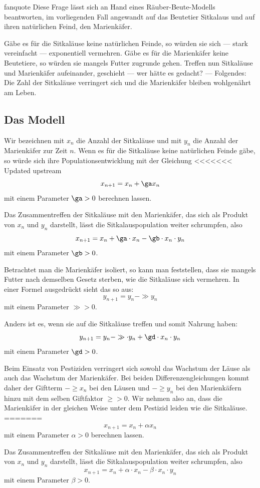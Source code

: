 \documentclass[%
<<<<<<< Updated upstream
<<<<<<< Updated upstream
11pt,%
twoside,%
titlepage,%
german,%
headsepline%
]{scrartcl}
\begin{document}
\begin{uebenv}{fanquote}
Diese Frage lässt sich an Hand eines Räuber-Beute-Modells beantworten, im vorliegenden Fall angewandt auf das Beutetier Sitkalaus und auf ihren natürlichen Feind, den Marienkäfer.

Gäbe es für die Sitkaläuse keine natürlichen Feinde, so würden sie sich --- stark vereinfacht --- exponentiell vermehren. Gäbe es für die Marienkäfer keine Beutetiere, so würden sie mangels Futter zugrunde gehen. Treffen nun Sitkaläuse und Marienkäfer aufeinander, geschieht --- wer hätte es gedacht? --- Folgendes: Die Zahl der Sitkaläuse verringert sich und die Marienkäfer bleiben wohlgenährt am Leben.

\subsection{Das Modell}
Wir bezeichnen mit $x_n$ die Anzahl der Sitkaläuse und mit $y_n$ die Anzahl der Marienkäfer zur Zeit $n$.
Wenn es für die Sitkaläuse keine natürlichen Feinde gäbe, so würde sich ihre Populationsentwicklung mit der Gleichung
<<<<<<< Updated upstream
$$x_{n+1}=x_n+\ga x_n$$
mit einem Parameter $\ga > 0$ berechnen lassen.

Das Zusammentreffen der Sitkaläuse mit den Marienkäfer, das sich als Produkt von $x_n$ und $y_n$ darstellt, lässt die Sitkalauspopulation weiter schrumpfen, also
$$x_{n+1}=x_n+\ga\cdot x_n-\gb\cdot x_n\cdot y_n$$
mit einem Parameter $\gb > 0$.

Betrachtet man die Marienkäfer isoliert, so kann man feststellen, dass sie mangels Futter nach demselben Gesetz sterben, wie die Sitkaläuse sich vermehren. In einer Formel ausgedrückt sieht das so aus:
$$y_{n+1}=y_n-\gg y_n$$
mit einem Parameter $\gg > 0$.

Anders ist es, wenn sie auf die Sitkaläuse treffen und somit Nahrung haben:
$$y_{n+1}=y_n-\gg\cdot y_n+\gd\cdot x_n\cdot y_n$$
mit einem Parameter $\gd> 0$.

Beim Einsatz von Pestiziden verringert sich sowohl das Wachstum der Läuse als auch das Wachstum der Marienkäfer. Bei beiden Differenzengleichungen kommt daher der Giftterm $-\ge x_n$ bei den Läusen und $-\ge y_n$ bei den Marienkäfern hinzu mit dem selben Giftfaktor $\ge > 0$. Wir nehmen also an, dass die Marienkäfer in der gleichen Weise unter dem Pestizid leiden wie die Sitkaläuse.
=======
$$x_{n+1}=x_n+\alpha x_n$$
mit einem Parameter $\alpha > 0$ berechnen lassen.

Das Zusammentreffen der Sitkaläuse mit den Marienkäfer, das sich als Produkt von $x_n$ und $y_n$ darstellt, lässt die Sitkalauspopulation weiter schrumpfen, also
$$x_{n+1}=x_n+\alpha\cdot x_n-\beta\cdot x_n\cdot y_n$$
mit einem Parameter $\beta > 0$.


\end{uebenv}
\end{document}
